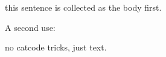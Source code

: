 \documentclass{article}
\begin{document}
\begin{shout}
this sentence is collected as the body first.
\end{shout}
A second use:
\begin{shout}
no catcode tricks, just text.
\end{shout}
\end{document}
